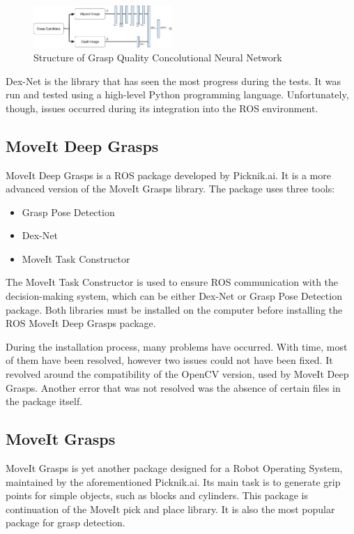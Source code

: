 \documentclass[conference,a4paper]{IEEEtran}
\begin{document}
\begin{figure}[ht]
  \centering
  \includegraphics[width=0.47\textwidth]{img/gqcnn.png}
  \caption{Structure of Grasp Quality Concolutional Neural Network}
\end{figure}

Dex-Net is the library that has seen the most progress during the tests. It was run and tested using a high-level Python programming language. Unfortunately, though, issues occurred during its integration into the ROS environment.

\subsection{MoveIt Deep Grasps}
MoveIt Deep Grasps is a ROS package developed by Picknik.ai. It is a more advanced version of the MoveIt Grasps library. The package uses three tools:

\begin{itemize}
\item Grasp Pose Detection
\item Dex-Net
\item MoveIt Task Constructor
\end{itemize}

The MoveIt Task Constructor is used to ensure ROS communication with the decision-making system, which can be either Dex-Net or Grasp Pose Detection package. Both libraries must be installed on the computer before installing the ROS MoveIt Deep Grasps package.

During the installation process, many problems have occurred. With time, most of them have been resolved, however two issues could not have been fixed. It revolved around the compatibility of the OpenCV version, used by MoveIt Deep Grasps. Another error that was not resolved was the absence of certain files in the package itself.

\subsection{MoveIt Grasps}
MoveIt Grasps is yet another package designed for a Robot Operating System, maintained by the aforementioned Picknik.ai. Its main task is to generate grip points for simple objects, such as blocks and cylinders. This package is continuation of the MoveIt pick and place library. It is also the most popular package for grasp detection.
\end{document}
